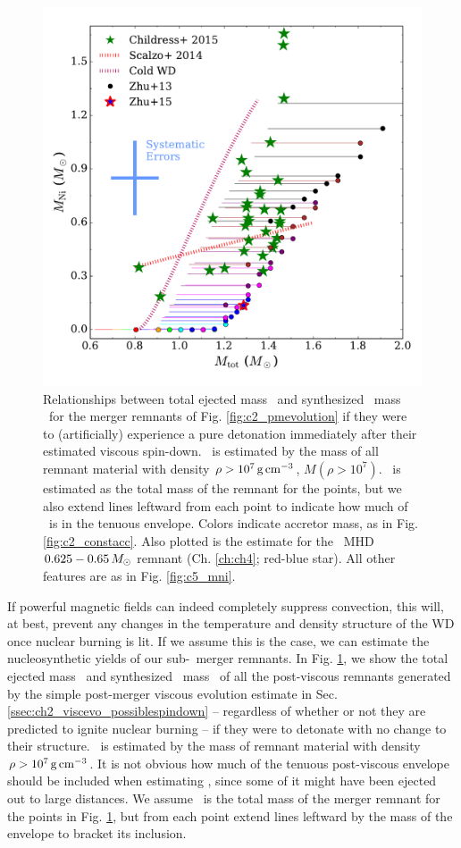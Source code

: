 \begin{figure}
\centering
\includegraphics[angle=0,width=0.8\columnwidth]{conclusion/figures/c_MNi.pdf}
\caption{Relationships between total ejected mass \Mtot\ and synthesized \Ni\ mass \MNi\ for the merger remnants of Fig. \ref{fig:c2_pmevolution} if they were to (artificially) experience a pure detonation immediately after their estimated viscous spin-down.  \MNi\ is estimated by the mass of all remnant material with density $\rho>10^7\,\gcc$, $M(\rho>10^7)$.  \Mtot\ is estimated as the total mass of the remnant for the points, but we also extend lines leftward from each point to indicate how much of \Mtot\ is in the tenuous envelope.  Colors indicate accretor mass, as in Fig. \ref{fig:c2_constacc}.  Also plotted is the estimate for the \arepo\ MHD $0.625 - 0.65\,\Msun$ remnant (Ch. \ref{ch:ch4}; red-blue star).  All other features are as in Fig. \ref{fig:c5_mni}.}
\label{fig:c6_mcmce_mni}
\end{figure}

If powerful magnetic fields can indeed completely suppress convection, this will, at best, prevent any changes in the temperature and density structure of the WD once nuclear burning is lit.  If we assume this is the case, we can estimate the nucleosynthetic yields of our sub-\Mch\ merger remnants.  In Fig. \ref{fig:c6_mcmce_mni}, we show the total ejected mass \Mtot\ and synthesized \Ni\ mass \MNi\ of all the post-viscous remnants generated by the simple post-merger viscous evolution estimate in Sec. \ref{ssec:ch2_viscevo_possiblespindown} -- regardless of whether or not they are predicted to ignite nuclear burning -- if they were to detonate with no change to their structure.  \MNi\ is estimated by the mass of remnant material with density $\rho>10^7\,\gcc$.  It is not obvious how much of the tenuous post-viscous envelope should be included when estimating \Mtot, since some of it might have been ejected out to large distances.  We assume \Mtot\ is the total mass of the merger remnant for the points in Fig. \ref{fig:c6_mcmce_mni}, but from each point extend lines leftward by the mass of the envelope to bracket its inclusion.

